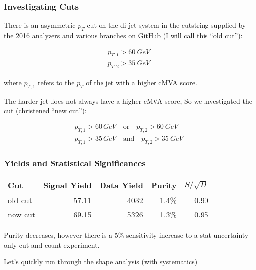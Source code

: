 \documentclass{beamer}
\begin{document}
\begin{frame}
  \frametitle{Investigating Cuts}

  There is an asymmetric $p_T$ cut on the di-jet system in the cutstring
  supplied by the 2016 analyzers and various branches on GitHub
  (I will call this ``old cut''):

  \begin{gather*}
    p_{T,1} > \SI{60}{GeV} \\
    p_{T,2} > \SI{35}{GeV}
  \end{gather*}

  where $p_{T,1}$ refers to the $p_T$ of the jet with a higher cMVA score.

  \vspace{12pt}

  The harder jet does not always have a higher cMVA score,
  So we investigated the cut (christened ``new cut''):

  \begin{gather*}
    p_{T,1} > \SI{60}{GeV} \quad \mathrm{or} \quad p_{T,2} > \SI{60}{GeV} \\
    p_{T,1} > \SI{35}{GeV} \quad \mathrm{and} \quad p_{T,2} > \SI{35}{GeV}
  \end{gather*}

\end{frame}

\begin{frame}
  \frametitle{Yields and Statistical Significances}

  \begin{center}
    \begin{tabular}{|l|r|r|r|r|}
      \hline
      Cut & Signal Yield & Data Yield & Purity & $S/\sqrt{D}$ \\
      \hline
      old cut & 57.11 & 4032 & 1.4\% & 0.90 \\
      new cut & 69.15 & 5326 & 1.3\% & 0.95 \\
      \hline
    \end{tabular}
  \end{center}

  Purity decreases, however there is a 5\% sensitivity increase
  to a stat-uncertainty-only cut-and-count experiment.

  \vspace{12pt}

  Let's quickly run through the shape analysis (with systematics)

\end{frame}
\end{document}
